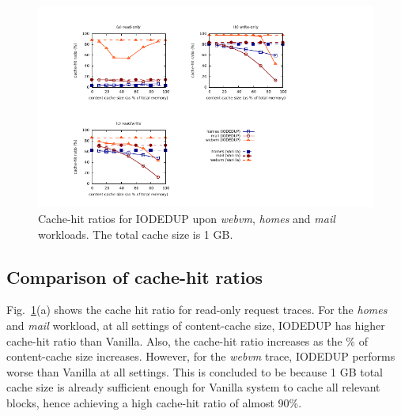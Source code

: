 \begin{figure}
	\begin{minipage}{0.9\textwidth}
\vspace{-1in}
\hspace{-1.5in}
\includegraphics[scale=1.95]{drivechap-figures/sweetspot/sweetspot-multiplot-revised.pdf}
	\vspace{-0.5in}
	\caption{Cache-hit ratios for IODEDUP upon \textit{webvm}, \textit{homes} and \textit{mail} workloads. The total cache size is 1 GB.}
\label{fig:sweetspot}
	\end{minipage}
\end{figure}



\subsection{Comparison of cache-hit ratios}

Fig.~\ref{fig:sweetspot}(a) shows the cache hit ratio for read-only
request traces.
For the \textit{homes} and \textit{mail} workload,
at all settings of content-cache size,
IODEDUP has higher cache-hit ratio than Vanilla. Also, the cache-hit
ratio increases as the \% of content-cache size increases.
However, for the \textit{webvm} trace,
IODEDUP performs worse than Vanilla at all settings. This
is concluded to be because
1 GB total cache size is
already sufficient enough for Vanilla system to cache all relevant
blocks, hence achieving a high cache-hit ratio of almost 90\%.

